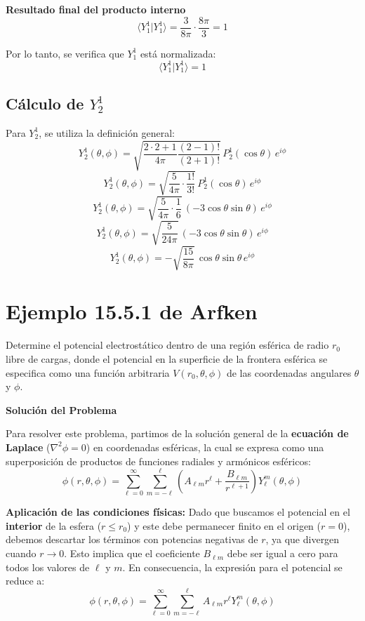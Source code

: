 \documentclass[a4paper]{article}
\begin{document}
\textbf{Resultado final del producto interno}
$$
\langle Y_1^1 | Y_1^1 \rangle = \frac{3}{8\pi} \cdot \frac{8\pi}{3} = 1
$$

Por lo tanto, se verifica que $Y_1^1$ está normalizada:
$$
\langle Y_1^1 | Y_1^1 \rangle = 1
$$


\subsection{Cálculo de $Y_2^1$}

Para $Y_2^1$, se utiliza la definición general:
$$
Y_2^1(\theta, \phi) = \sqrt{\frac{2 \cdot 2 + 1}{4\pi} \frac{(2-1)!}{(2+1)!}} \, P_2^1(\cos \theta) \, e^{i\phi}
$$
$$
Y_2^1(\theta, \phi) = \sqrt{\frac{5}{4\pi} \cdot \frac{1!}{3!}} \, P_2^1(\cos \theta) \, e^{i\phi}
$$
$$
Y_2^1(\theta, \phi) = \sqrt{\frac{5}{4\pi} \cdot \frac{1}{6}} \, (-3 \cos \theta \sin \theta) \, e^{i\phi}
$$
$$
Y_2^1(\theta, \phi) = \sqrt{\frac{5}{24\pi}} \, (-3 \cos \theta \sin \theta) \, e^{i\phi}
$$
$$
Y_2^1(\theta, \phi) = -\sqrt{\frac{15}{8\pi}} \, \cos \theta \sin \theta \, e^{i\phi}
$$

\section{Ejemplo 15.5.1 de Arfken}

Determine el potencial electrostático dentro de una región esférica de radio $r_0$ libre de cargas, donde el potencial en la superficie de la frontera esférica se especifica como una función arbitraria $V(r_0, \theta, \phi)$ de las coordenadas angulares $\theta$ y $\phi$.

\textbf{Solución del Problema}

Para resolver este problema, partimos de la solución general de la \textbf{ecuación de Laplace} ($\nabla^2\phi = 0$) en coordenadas esféricas, la cual se expresa como una superposición de productos de funciones radiales y armónicos esféricos:
$$
\phi(r, \theta, \phi) = \sum_{\ell=0}^\infty \sum_{m=-\ell}^\ell \left( A_{\ell m} r^\ell + \frac{B_{\ell m}}{r^{\ell+1}} \right) Y_\ell^m(\theta, \phi)
$$

\textbf{Aplicación de las condiciones físicas:}
Dado que buscamos el potencial en el \textbf{interior} de la esfera ($r \leq r_0$) y este debe permanecer finito en el origen ($r=0$), debemos descartar los términos con potencias negativas de $r$, ya que divergen cuando $r \to 0$. Esto implica que el coeficiente $B_{\ell m}$ debe ser igual a cero para todos los valores de $\ell$ y $m$. En consecuencia, la expresión para el potencial se reduce a:
$$
\phi(r, \theta, \phi) = \sum_{\ell=0}^\infty \sum_{m=-\ell}^\ell A_{\ell m} r^\ell Y_\ell^m(\theta, \phi)
$$
\end{document}
